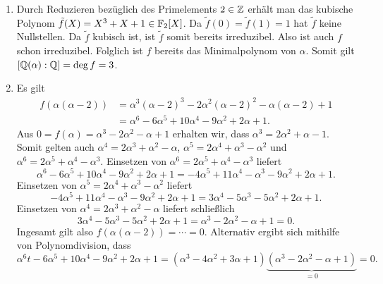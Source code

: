 \begin{solution}
  \begin{enumerate}
    \item
      Durch Reduzieren bezüglich des Primelements $2 \in \mathbb{Z}$ erhält man das kubische Polynom $\tilde{f}(X) = X^3 + X + 1 \in \mathbb{F}_2[X]$.
      Da $\tilde{f}(0) = \tilde{f}(1) = 1$ hat $\tilde{f}$ keine Nullstellen.
      Da $\tilde{f}$ kubisch ist, ist $\tilde{f}$ somit bereits irreduzibel.
      Also ist auch $f$ schon irreduzibel.
      Folglich ist $f$ bereits das Minimalpolynom von $\alpha$.
      Somit gilt $[\mathbb{Q}(\alpha) : \mathbb{Q}] = \deg f = 3$.
      
    \item
      Es gilt
      \begin{align*}
        \label{equation: polynomial of degree 6}
            f(\alpha(\alpha-2))
        &=  \alpha^3 (\alpha-2)^3 - 2 \alpha^2 (\alpha-2)^2 - \alpha(\alpha-2) + 1
        \\
        &=  \alpha^6 - 6 \alpha^5 + 10 \alpha^4 - 9 \alpha^2 + 2 \alpha + 1.
      \end{align*}
      Aus $0 = f(\alpha) = \alpha^3 - 2 \alpha^2 - \alpha + 1$ erhalten wir, dass $\alpha^3 = 2 \alpha^2 + \alpha - 1$.
      Somit gelten auch $\alpha^4 = 2 \alpha^3 + \alpha^2 - \alpha$, $\alpha^5 = 2 \alpha^4 + \alpha^3 - \alpha^2$ und $\alpha^6 = 2 \alpha^5 + \alpha^4 - \alpha^3$.
      Einsetzen von $\alpha^6 = 2 \alpha^5 + \alpha^4 - \alpha^3$ liefert
      \[
          \alpha^6 - 6 \alpha^5 + 10 \alpha^4 - 9 \alpha^2 + 2 \alpha + 1
        = -4 \alpha^5 + 11 \alpha^4 - \alpha^3 - 9 \alpha^2 + 2 \alpha + 1.
      \]
      Einsetzen von $\alpha^5 = 2 \alpha^4 + \alpha^3 - \alpha^2$ liefert
      \[
          -4 \alpha^5 + 11 \alpha^4 - \alpha^3 - 9 \alpha^2 + 2 \alpha + 1
        = 3 \alpha^4 - 5 \alpha^3 - 5 \alpha^2 + 2 \alpha + 1.
      \]
      Einsetzen von $\alpha^4 = 2 \alpha^3 + \alpha^2 - \alpha$ liefert schließlich
      \[
          3 \alpha^4 - 5 \alpha^3 - 5 \alpha^2 + 2 \alpha + 1
        = \alpha^3 - 2 \alpha^2 - \alpha + 1
        = 0.
      \]
      Ingesamt gilt also $f(\alpha (\alpha - 2)) = \dotsb = 0$.
      Alternativ ergibt sich mithilfe von Polynomdivision, dass
      \[
          \alpha^6t - 6 \alpha^5 + 10 \alpha^4 - 9 \alpha^2 + 2 \alpha + 1
        = (\alpha^3 - 4 \alpha^2 + 3 \alpha + 1)\underbrace{(\alpha^3 - 2 \alpha^2 - \alpha + 1)}_{=0}
        = 0.
      \]
      

\end{enumerate}
\end{solution}
